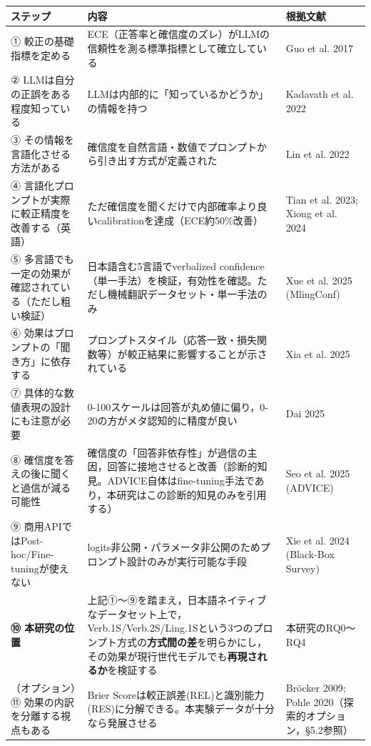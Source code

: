 \documentclass[11pt,a4paper,oneside]{article}
\begin{document}
\begin{longtable}{p{}p{}p{}}
\toprule
ステップ & 内容 & 根拠文献 \\
\midrule
\endhead
① 較正の基礎指標を定める & ECE（正答率と確信度のズレ）がLLMの信頼性を測る標準指標として確立している & Guo et al. 2017 \\
② LLMは自分の正誤をある程度知っている & LLMは内部的に「知っているかどうか」の情報を持つ & Kadavath et al. 2022 \\
③ その情報を言語化させる方法がある & 確信度を自然言語・数値でプロンプトから引き出す方式が定義された & Lin et al. 2022 \\
④ 言語化プロンプトが実際に較正精度を改善する（英語） & ただ確信度を聞くだけで内部確率より良いcalibrationを達成（ECE約50\%改善） & Tian et al. 2023; Xiong et al. 2024 \\
⑤ 多言語でも一定の効果が確認されている（ただし粗い検証） & 日本語含む5言語でverbalized confidence（単一手法）を検証，有効性を確認。ただし機械翻訳データセット・単一手法のみ & Xue et al. 2025 (MlingConf) \\
⑥ 効果はプロンプトの「聞き方」に依存する & プロンプトスタイル（応答一致・損失関数等）が較正結果に影響することが示されている & Xia et al. 2025 \\
⑦ 具体的な数値表現の設計にも注意が必要 & 0-100スケールは回答が丸め値に偏り，0-20の方がメタ認知的に精度が良い & Dai 2025 \\
⑧ 確信度を答えの後に聞くと過信が減る可能性 & 確信度の「回答非依存性」が過信の主因，回答に接地させると改善（診断的知見。ADVICE自体はfine-tuning手法であり，本研究はこの診断的知見のみを引用する） & Seo et al. 2025 (ADVICE) \\
⑨ 商用APIではPost-hoc/Fine-tuningが使えない & logits非公開・パラメータ非公開のためプロンプト設計のみが実行可能な手段 & Xie et al. 2024 (Black-Box Survey) \\
\textbf{⑩ 本研究の位置} & 上記①〜⑨を踏まえ，日本語ネイティブなデータセット上で，Verb.1S/Verb.2S/Ling.1Sという3つのプロンプト方式の\textbf{方式間の差}を明らかにし，その効果が現行世代モデルでも\textbf{再現されるか}を検証する & 本研究のRQ0〜RQ4 \\
（オプション）⑪ 効果の内訳を分離する視点もある & Brier Scoreは較正誤差(REL)と識別能力(RES)に分解できる。本実験データが十分なら発展させる & Bröcker 2009; Pohle 2020（探索的オプション，§5.2参照） \\
\bottomrule
\end{longtable}

\end{document}
